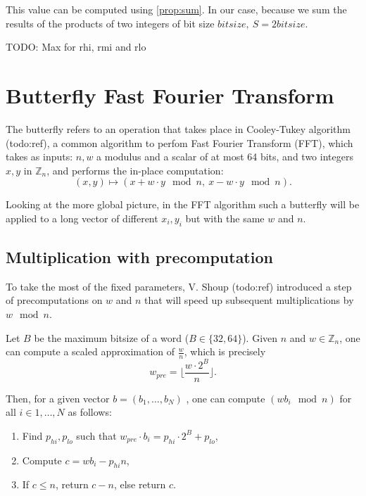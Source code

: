 \documentclass[a4paper]{article}
\begin{document}
This value can be computed using \ref{prop:sum}. In our case, because we sum the results of the products of two integers of bit size $bitsize,\ S = 2 bitsize$.

TODO: Max for rhi, rmi and rlo



\section{Butterfly Fast Fourier Transform}

The butterfly refers to an operation that takes place in Cooley-Tukey algorithm (todo:ref), a common algorithm to perfom 
Fast Fourier Transform (FFT), which takes as inputs: $n, w$ a modulus and a scalar of at most 64 bits, and two integers 
$x, y$ in $\mathbb{Z}_n$, and performs the in-place computation:
\[
(x,y) \mapsto (x + w\cdot y \mod n,\ x - w\cdot y \mod n).
\]

Looking at the more global picture, in the FFT algorithm such a butterfly will
be applied to a long vector of different \(x_i, y_i\) but with the same \(w\) and \(n\).


\subsection{Multiplication with precomputation}

To take the most of the fixed parameters, V. Shoup (todo:ref) introduced a step of precomputations on $w$ and $n$ that will speed up subsequent multiplications by $w \mod n$.

Let $B$ be the maximum bitsize of a word ($B\in \{32, 64\}$). Given $n$ and $w \in \mathbb{Z}_n$, one can compute a scaled approximation 
of $\frac{w}{n}$, which is precisely $$ w_{pre} = \biggl\lfloor\dfrac{w\cdot 2^{B}}{n} \biggr\rfloor.$$

Then, for a given vector $b = (b_1,\dots, b_N)$ , one can compute $(wb_i \mod n)$ for all $i\in{1,\dots, N}$ as follows:

\begin{enumerate}
    \item Find $p_{hi}, p_{lo}$ such that $w_{pre} \cdot b_i = p_{hi}\cdot 2^B + p_{lo}$,
    \item Compute $c = wb_i - p_{hi}n$,
    \item If $c \leq n$, return $c-n$, else return $c$.
\end{enumerate}
\end{document}
